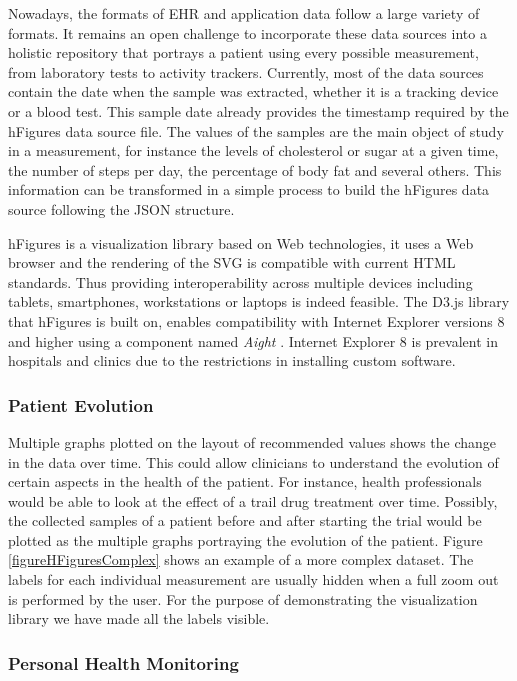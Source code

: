 \documentclass[twocolumn]{bmcart}%
\begin{document}
Nowadays, the formats of EHR and application data follow a large variety of formats. It remains an open challenge to incorporate these data sources into a holistic repository that portrays a patient using every possible measurement, from laboratory tests to activity trackers. Currently, most of the data sources contain the date when the sample was extracted, whether it is a tracking device or a blood test. This sample date already provides the timestamp required by the hFigures data source file. The values of the samples are the main object of study in a measurement, for instance the levels of cholesterol or sugar at a given time, the number of steps per day, the percentage of body fat and several others. This information can be transformed in a simple process to build the hFigures data source following the JSON structure.

hFigures is a visualization library based on Web technologies, it uses a Web browser and the rendering of the SVG is compatible with current HTML standards. Thus providing interoperability across multiple devices including tablets, smartphones, workstations or laptops is indeed feasible. The D3.js library that hFigures is built on, enables compatibility with Internet Explorer versions 8 and higher using a component named \textit{Aight} \cite{aight}. Internet Explorer 8 is prevalent in hospitals and clinics due to the restrictions in installing custom software.

\subsubsection*{Patient Evolution}

Multiple graphs plotted on the layout of recommended values shows the change in the data over time. This could allow clinicians to understand the evolution of certain aspects in the health of the patient. For instance, health professionals would be able to look at the effect of a trail drug treatment over time. Possibly, the collected samples of a patient before and after starting the trial would be plotted as the multiple graphs portraying the evolution of the patient. Figure \ref{figureHFiguresComplex} shows an example of a more complex dataset. The labels for each individual measurement are usually hidden when a full zoom out is performed by the user. For the purpose of demonstrating the visualization library we have made all the labels visible. 


\subsubsection*{Personal Health Monitoring}
\end{document}
